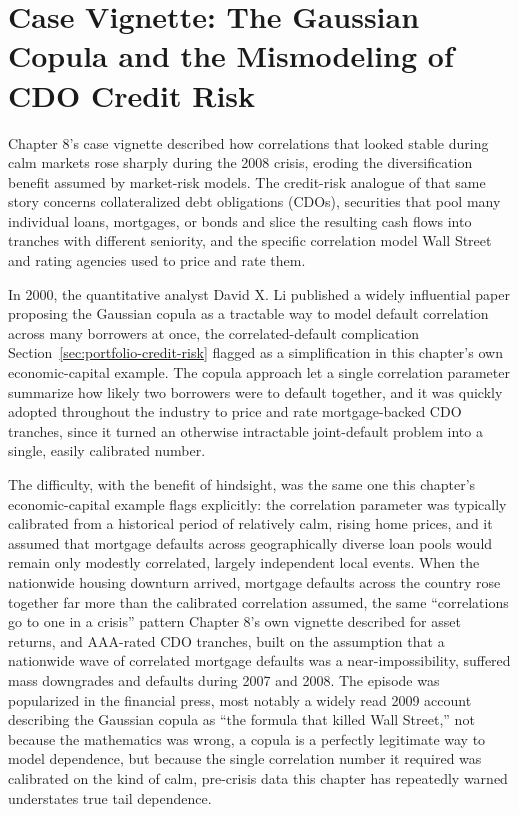 \documentclass[../ai_in_finance]{subfiles}
\begin{document}
\section{Case Vignette: The Gaussian Copula and the Mismodeling of CDO Credit Risk}

Chapter 8's case vignette described how correlations that looked stable during calm markets rose sharply during the 2008 crisis, eroding the diversification benefit assumed by market-risk models. The credit-risk analogue of that same story concerns collateralized debt obligations (CDOs), securities that pool many individual loans, mortgages, or bonds and slice the resulting cash flows into tranches with different seniority, and the specific correlation model Wall Street and rating agencies used to price and rate them.

In 2000, the quantitative analyst David X. Li published a widely influential paper proposing the Gaussian copula as a tractable way to model default correlation across many borrowers at once, the correlated-default complication Section~\ref{sec:portfolio-credit-risk} flagged as a simplification in this chapter's own economic-capital example. The copula approach let a single correlation parameter summarize how likely two borrowers were to default together, and it was quickly adopted throughout the industry to price and rate mortgage-backed CDO tranches, since it turned an otherwise intractable joint-default problem into a single, easily calibrated number.

The difficulty, with the benefit of hindsight, was the same one this chapter's economic-capital example flags explicitly: the correlation parameter was typically calibrated from a historical period of relatively calm, rising home prices, and it assumed that mortgage defaults across geographically diverse loan pools would remain only modestly correlated, largely independent local events. When the nationwide housing downturn arrived, mortgage defaults across the country rose together far more than the calibrated correlation assumed, the same ``correlations go to one in a crisis'' pattern Chapter 8's own vignette described for asset returns, and AAA-rated CDO tranches, built on the assumption that a nationwide wave of correlated mortgage defaults was a near-impossibility, suffered mass downgrades and defaults during 2007 and 2008.
The episode was popularized in the financial press, most notably a widely read 2009 account describing the Gaussian copula as ``the formula that killed Wall Street,'' not because the mathematics was wrong, a copula is a perfectly legitimate way to model dependence, but because the single correlation number it required was calibrated on the kind of calm, pre-crisis data this chapter has repeatedly warned understates true tail dependence.
\end{document}
